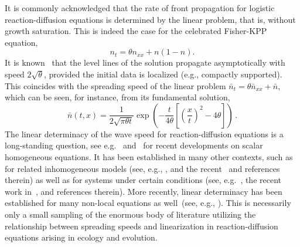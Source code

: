 \documentclass[10pt]{amsart}
\theoremstyle{definition}\newtheorem{defi}[theo]{Definition}\newtheorem{rema}[theo]{Remark}\newtheorem{exam}[theo]{Example}\newtheorem{exem}[theo]{Example}\newtheorem{nota}[theo]{Notation}
\newcommand{\1}{\mathds{1}}
\begin{document}
It is commonly acknowledged that the rate of front propagation for logistic reaction-diffusion equations is determined by the linear problem, that is, without growth saturation. This is indeed the case for the celebrated Fisher-KPP equation,
\begin{equation}\label{eq:FKPP}
n_t = \theta n_{xx} + n(1-n).
\end{equation}
It is known~\cite{AronsonWeinberger2,Fisher,KPP} that the level lines of the solution propagate asymptotically with speed $2\sqrt{\theta}$, provided the initial data is localized (e.g., compactly supported). This coincides with the spreading speed of the linear problem $\bar n_t = \theta \bar n_{xx} + \bar n$, which can be seen, for instance, from its fundamental solution,
\begin{equation*}
\bar n(t,x) = \dfrac{1}{2\sqrt{\pi \theta t}}\exp\left(-\dfrac{t}{4\theta} \left [\left(\dfrac{x}t\right)^2 - 4\theta \right]\right)\,.
\end{equation*}
The linear determinacy of the wave speed for reaction-diffusion equations is a long-standing question, see e.g.~\cite{crooks_travelling_2003,hadeler_travelling_1975} and~\cite{lucia_linear_2004,weinberger_sufficient_2012} for recent developments on scalar homogeneous equations. It has been established in many other contexts, such as for related inhomogeneous models (see, e.g., \cite{BerestyckiHamel02,berestycki_speed_2005}, and the recent~\cite{nadin_generalized_2017} and references therein) as well as for systems under certain conditions (see, e.g.~\cite{lewis_spreading_2002,li_spreading_2005, weinberger_analysis_2002}, the recent work in~\cite{girardin_non-cooperative_2018,girardin_non-cooperative_2018-1}, and references therein). More recently, linear determinacy has been established for many non-local equations as well~(see, e.g., \cite{AlfaroCovilleRaoul,BerestyckiJinSilvestre,berestycki_non-local_2009, HamelRyzhik}). This is necessarily only a small sampling of the enormous body of literature utilizing the relationship between spreading speeds and linearization in reaction-diffusion equations arising in ecology and evolution.
\end{document}
